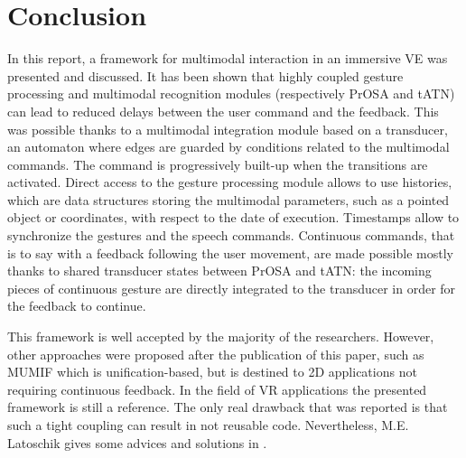 \documentclass[a4paper]{article}
\begin{document}
\section{Conclusion}

In this report, a framework for multimodal interaction in an immersive VE was presented and discussed. It has been shown that highly coupled gesture processing and multimodal recognition modules (respectively PrOSA and tATN) can lead to reduced delays between the user command and the feedback. This was possible thanks to a multimodal integration module based on a transducer, an automaton where edges are guarded by conditions related to the multimodal commands. The command is progressively built-up when the transitions are activated. Direct access to the gesture processing module allows to use histories, which are data structures storing the multimodal parameters, such as a pointed object or coordinates, with respect to the date of execution. Timestamps allow to synchronize the gestures and the speech commands. Continuous commands, that is to say with a feedback following the user movement, are made possible mostly thanks to shared transducer states between PrOSA and tATN: the incoming pieces of continuous gesture are directly integrated to the transducer in order for the feedback to continue.

This framework is well accepted by the majority of the researchers. However, other approaches were proposed after the publication of this paper, such as MUMIF \cite{mumif} which is unification-based, but is destined to 2D applications not requiring continuous feedback. In the field of VR applications the presented framework is still a reference. The only real drawback that was reported is that such a tight coupling can result in not reusable code. Nevertheless, M.E. Latoschik gives some advices and solutions in \cite{hcii}.

\end{document}
